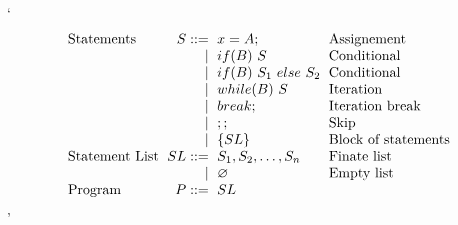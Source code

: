 `\[\arraycolsep=3pt
\begin{array}{lrll}

  

  \textnormal{Statements} & S ::= & x = A ; & \textnormal{Assignement}\\
  & \mid & if (B)~ S & \textnormal{Conditional} \\
  & \mid & if (B)~ S_1~else~S_2  & \textnormal{Conditional} \\
  & \mid & while (B)~S & \textnormal{Iteration} \\
  & \mid & break; & \textnormal{Iteration break} \\
  & \mid & ;; & \textnormal{Skip} \\
  & \mid & \{SL\} & \textnormal{Block of statements} \\

  
  \textnormal{Statement List} & SL ::= & S_1, S_2, \dots , S_n & \textnormal{Finate list}\\
   & \mid & \varnothing & \textnormal{Empty list} \\
  \textnormal{Program} & P ::= & SL & \textnormal{}\\
  
  
\end{array}
\]'